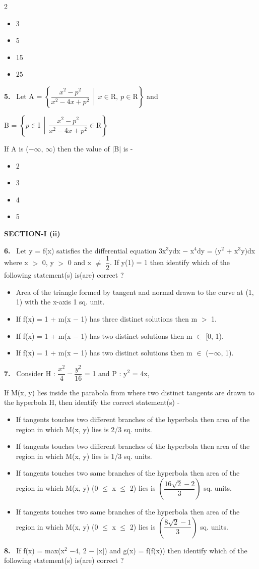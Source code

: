\documentclass[10pt]{extarticle}
\newcommand{\sect}[1]{\par\smallskip\noindent\textbf{#1}\par}
\newcommand{\qn}[1]{\par\smallskip\noindent\textbf{#1.}~}
\newenvironment{qoptions}{\begin{itemize}[leftmargin=1.8em,itemsep=1pt,topsep=2pt,label={}]}{\end{itemize}}
\newcommand{\opt}[2]{\item[(#1)] #2}
\begin{document}
\begin{multicols}{2}
\begin{qoptions}
\opt{A}{3}
\opt{B}{5}
\opt{C}{15}
\opt{D}{25}
\end{qoptions}
\qn{5} Let A = $\left\{\dfrac{x^2-p^2}{x^2-4x+p^2}\,\middle|\,x\in\mathrm R,\ p\in\mathrm R\right\}$ and\par
B = $\left\{p\in\mathrm I\,\middle|\,\dfrac{x^2-p^2}{x^2-4x+p^2}\in\mathrm R\right\}$\par
If A is ($-\infty$, $\infty$) then the value of $|$B$|$ is -\par
[Note : $|$M$|$ denotes the number of elements in set M]
\begin{qoptions}
\opt{A}{2}
\opt{B}{3}
\opt{C}{4}
\opt{D}{5}
\end{qoptions}
\sect{SECTION-I (ii)}
\qn{6} Let y = f(x) satisfies the differential equation 3x$^3$ydx $-$ x$^4$dy = (y$^2$ + x$^3$y)dx where x $>$ 0, y $>$ 0 and x $\neq$ $\dfrac12$. If y(1) = 1 then identify which of the following statement(s) is(are) correct ?
\begin{qoptions}
\opt{A}{Area of the triangle formed by tangent and normal drawn to the curve at (1, 1) with the x-axis 1 sq. unit.}
\opt{B}{If f(x) = 1 + m(x $-$ 1) has three distinct solutions then m $>$ 1.}
\opt{C}{If f(x) = 1 + m(x $-$ 1) has two distinct solutions then m $\in$ [0, 1).}
\opt{D}{If f(x) = 1 + m(x $-$ 1) has two distinct solutions then m $\in$ ($-\infty$, 1).}
\end{qoptions}
\qn{7} Consider H : $\dfrac{x^2}4-\dfrac{y^2}{16}$ = 1 and P : y$^2$ = 4x,\par
If M(x, y) lies inside the parabola from where two distinct tangents are drawn to the hyperbola H, then identify the correct statement(s) -
\begin{qoptions}
\opt{A}{If tangents touches two different branches of the hyperbola then area of the region in which M(x, y) lies is 2/3 sq. units.}
\opt{B}{If tangents touches two different branches of the hyperbola then area of the region in which M(x, y) lies is 1/3 sq. units.}
\opt{C}{If tangents touches two same branches of the hyperbola then area of the region in which M(x, y) (0 $\le$ x $\le$ 2) lies is $\left(\dfrac{16\sqrt2-2}3\right)$ sq. units.}
\opt{D}{If tangents touches two same branches of the hyperbola then area of the region in which M(x, y) (0 $\le$ x $\le$ 2) lies is $\left(\dfrac{8\sqrt2-1}3\right)$ sq. units.}
\end{qoptions}
\qn{8} If f(x) = max(x$^2$ $-$4, 2 $-$ $|$x$|$) and g(x) = f(f(x)) then identify which of the following statement(s) is(are) correct ?

\end{multicols}
\end{document}
